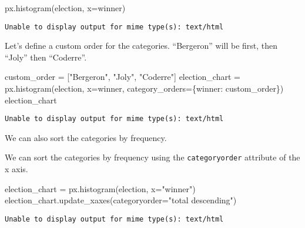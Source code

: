 \documentclass[
  letterpaper,
  DIV=11,
  numbers=noendperiod]{scrreprt}
\newenvironment{Shaded}{\begin{snugshade}}{\end{snugshade}}
\newcommand{\NormalTok}[1]{\textcolor[rgb]{0.00,0.23,0.31}{#1}}
\newcommand{\OperatorTok}[1]{\textcolor[rgb]{0.37,0.37,0.37}{#1}}
\newcommand{\StringTok}[1]{\textcolor[rgb]{0.13,0.47,0.30}{#1}}
\begin{document}
\begin{Shaded}
\begin{Highlighting}[]
\NormalTok{px.histogram(election, x}\OperatorTok{=}\StringTok{\textquotesingle{}winner\textquotesingle{}}\NormalTok{)}
\end{Highlighting}
\end{Shaded}

\begin{verbatim}
Unable to display output for mime type(s): text/html
\end{verbatim}

Let's define a custom order for the categories. ``Bergeron'' will be
first, then ``Joly'' then ``Coderre''.

\begin{Shaded}
\begin{Highlighting}[]
\NormalTok{custom\_order }\OperatorTok{=}\NormalTok{ [}\StringTok{"Bergeron"}\NormalTok{, }\StringTok{"Joly"}\NormalTok{, }\StringTok{"Coderre"}\NormalTok{]}
\NormalTok{election\_chart }\OperatorTok{=}\NormalTok{ px.histogram(election, x}\OperatorTok{=}\StringTok{\textquotesingle{}winner\textquotesingle{}}\NormalTok{, category\_orders}\OperatorTok{=}\NormalTok{\{}\StringTok{\textquotesingle{}winner\textquotesingle{}}\NormalTok{: custom\_order\})}
\NormalTok{election\_chart}
\end{Highlighting}
\end{Shaded}

\begin{verbatim}
Unable to display output for mime type(s): text/html
\end{verbatim}

We can also sort the categories by frequency.

We can sort the categories by frequency using the \texttt{categoryorder}
attribute of the x axis.

\begin{Shaded}
\begin{Highlighting}[]
\NormalTok{election\_chart }\OperatorTok{=}\NormalTok{ px.histogram(election, x}\OperatorTok{=}\StringTok{"winner"}\NormalTok{)}
\NormalTok{election\_chart.update\_xaxes(categoryorder}\OperatorTok{=}\StringTok{"total descending"}\NormalTok{)}
\end{Highlighting}
\end{Shaded}

\begin{verbatim}
Unable to display output for mime type(s): text/html
\end{verbatim}
\end{document}

